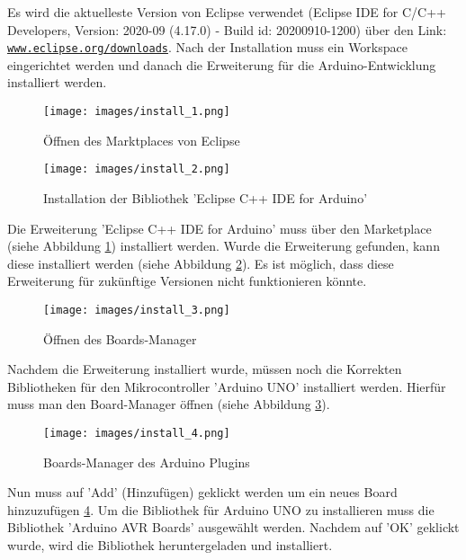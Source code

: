 Es wird die aktuelleste Version von Eclipse verwendet (Eclipse IDE for C/C++ Developers, Version: 2020-09 (4.17.0) - Build id: 20200910-1200) über den Link: 
\href{https://www.eclipse.org/downloads/packages/release/2020-09/r/eclipse-ide-cc-developers}{\nolinkurl{www.eclipse.org/downloads}}. Nach der Installation muss ein Workspace eingerichtet werden und danach die Erweiterung für die Arduino-Entwicklung installiert werden.

\begin{figure}[H]
    \caption{Öffnen des Marktplaces von Eclipse}
    \centering
    \texttt{[image: images/install\_1.png]}
    \label{fig:marktplace}
\end{figure}

\begin{figure}[H]
    \caption{Installation der Bibliothek 'Eclipse C++ IDE for Arduino'}
    \centering
    \texttt{[image: images/install\_2.png]}
    \label{fig:install_arduino}
\end{figure}

Die Erweiterung 'Eclipse C++ IDE for Arduino' muss über den Marketplace (siehe Abbildung \ref{fig:marktplace}) installiert werden. Wurde die Erweiterung gefunden, kann diese installiert werden (siehe Abbildung \ref{fig:install_arduino}). Es ist möglich, dass diese Erweiterung für zukünftige Versionen nicht funktionieren könnte.

\begin{figure}[H]
    \caption{Öffnen des Boards-Manager}
    \centering
    \texttt{[image: images/install\_3.png]}
    \label{fig:boardmanager}
\end{figure}

Nachdem die Erweiterung installiert wurde, müssen noch die Korrekten Bibliotheken für den Mikrocontroller 'Arduino UNO' installiert werden. Hierfür muss man den Board-Manager öffnen (siehe Abbildung \ref{fig:boardmanager}).

\begin{figure}[H]
    \caption{Boards-Manager des Arduino Plugins}
    \centering
    \texttt{[image: images/install\_4.png]}
    \label{fig:install_avr}
\end{figure}

Nun muss auf 'Add' (Hinzufügen) geklickt werden um ein neues Board hinzuzufügen \ref{fig:install_avr}. Um die Bibliothek für Arduino UNO zu installieren muss die Bibliothek 'Arduino AVR Boards' ausgewählt werden. Nachdem auf 'OK' geklickt wurde, wird die Bibliothek heruntergeladen und installiert.

